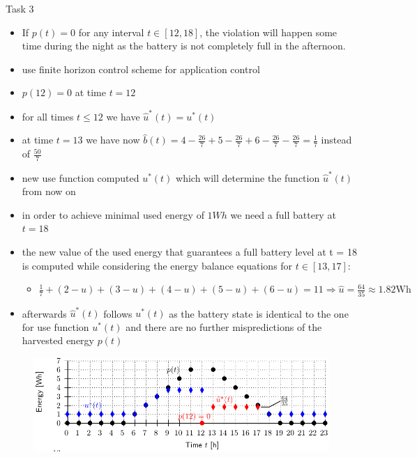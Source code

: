 \begin{frame}[allowframebreaks]{Task 3}{}
\begin{solution}
\begin{itemize}
      \item If $p(t)=0$ for any interval $t \in[12,18]$, the violation will happen some time during the night as the battery is not completely full in the afternoon.
    \end{itemize}
  \end{solution}
  \framebreak
  \begin{tasknoinc}
    \begin{itemize}
      \item use finite horizon control scheme for application control
      \item $p(12) = 0$ at time $t = 12$
    \end{itemize}
  \end{tasknoinc}
  \begin{solutionnoinc}
    \begin{itemize}
      \item for all times $t\le 12$ we have $\hat u^*(t) = u^*(t)$
      \item at time $t=13$ we have now $\hat b(t)= 4 - \frac{26}{7} + 5 - \frac{26}{7} + 6 - \frac{26}{7} - \frac{26}{7} =\frac{1}{7}$ instead of $\frac{50}{7}$
      \item new use function computed $u^*(t)$ which will determine the function $\hat u^*(t)$ from now on
      \item in order to achieve minimal used energy of $1Wh$ we need a full battery at $t=18$
      \item the new value of the used energy that guarantees a full battery level at t = 18 is computed while considering the energy balance equations for $t\in [13, 17]$:
      \begin{itemize}
        \item $\frac{1}{7}+(2-u)+(3-u)+(4-u)+(5-u)+(6-u)=11 \Rightarrow \hat{u}=\frac{64}{35} \approx 1.82 \mathrm{Wh}$
      \end{itemize}
      \item afterwards $\hat u^*(t)$ follows $u^*(t)$ as the battery state is identical to the one for use function $u^*(t)$ and there are no further mispredictions of the harvested energy $p(t)$
    \end{itemize}
  \end{solutionnoinc}
  \framebreak
  \begin{solutionnoinc}
    \begin{figure}
      \centering
      \includegraphics[width=\textwidth]{./figures/task5_use_and_harvest.png}

\end{figure}
\end{solutionnoinc}
\end{frame}
